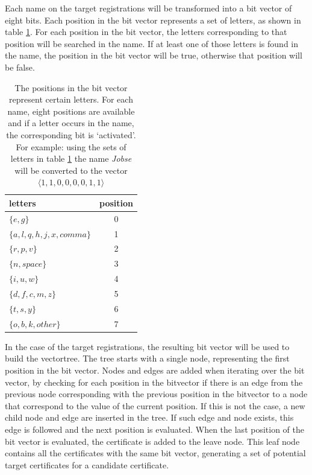 Each name on the target registrations will be transformed into a bit vector of eight bits. Each position in the bit vector represents a set of letters, as shown in table \ref{tab:letterpositions}. For each position in the bit vector, the letters corresponding to that position will be searched in the name. If at least one of those letters is found in the name, the position in the bit vector will be true, otherwise that position will be false.  \\

\begin{table}
	\centering
	\caption[Position of letters in a bitvector]{\label{tab:letterpositions}The positions in the bit vector represent certain letters. For each name, eight positions are available and if a letter occurs in the name, the corresponding bit is `activated'. For example: using the sets of letters in table \ref{tab:letterpositions} the name \textit{Jobse} will be converted to the vector $\langle1,1,0,0,0,0,1,1\rangle$}
	\vspace{0.5cm}
	\begin{tabular}{lc}
		\toprule
		letters & position \\
		\midrule
		$\{e, g\}$ & 0\\
		$\{a,l,q,h,j,x,comma\}$ & 1\\
		$\{r,p,v\}$ & 2\\
		$\{n, space\}$ & 3\\
		$\{i, u, w\}$ & 4\\
		$\{d,f,c,m,z\}$ & 5\\
		$\{t,s,y\}$ & 6\\
		$\{o,b,k,other\}$ & 7\\
		\bottomrule
	\end{tabular}
	
	
\end{table}
In the case of the target registrations, the resulting bit vector will be used to build the vectortree. The tree starts with a single node, representing the first position in the bit vector. Nodes and edges are added when iterating over the bit vector, by checking for each position in the bitvector if there is an edge from the previous node corresponding with the previous position in the bitvector to a node that correspond to the value of the current position. 
If this is not the case, a new child node and edge are inserted in the tree. If such edge and node exists, this edge is followed and the next position is evaluated. When the last position of the bit vector is evaluated, the certificate is added to the leave node. This leaf node contains all the certificates with the same bit vector, generating a set of potential target certificates for a candidate certificate. \\

